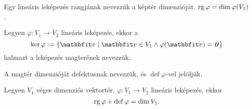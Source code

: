 \documentclass{szb-practice}
\begin{document}
\begin{definition}
  Egy lineáris leképezés rangjának nevezzük a képtér dimenzióját.
  $\operatorname{rg} \varphi = \dim \varphi(V_1)$.
\end{definition}

\begin{definition}
  Legyen $\varphi: V_1 \rightarrow V_2$ lineáris leképezés, ekkor a
  $$
    \ker \varphi := \{
    \rvec v \; | \; \rvec v \in V_1 \land \varphi(\rvec v) = \nvec
    \}
  $$
  halmazt a leképezés magterének nevezzük.
\end{definition}

\begin{definition}
  A magtér dimenzióját defektusnak nevezzük, és $\operatorname{def} \varphi$-vel
  jelöljük.
\end{definition}

\begin{theorem}
  Legyen $V_1$ véges dimenziós vektortér, $\varphi: V_1 \rightarrow V_2$
  lineáris leképezés, ekkor
  $$
    \operatorname{rg} \varphi + \operatorname{def} \varphi = \dim V_1
    \text.
  $$
\end{theorem}
\end{document}
